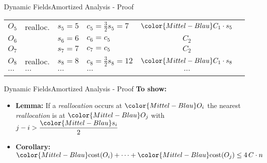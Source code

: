 \begin{frame}{Dynamic Fields}{Amortized Analysis - Proof}
\begin{table}[!h]
\begin{tabular}{|l|l|l|l|c|@{}l}
      \cmidrule{1-5}
      $O_5$ & {\color{Mittel-Blau}realloc.} &
      $s_5 = 5$ & {\color{Mittel-Blau}$c_5 = \frac{3}{2} s_5 = 7$} &
      ${\color{Mittel-Blau}C_1 \cdot s_5}$ &
      \raisebox{-0.5em}{\multirow{3}{*}{%
        $\left.\begin{array}{@{}l@{}}\\[3.25em]\end{array}\right\rbrace
        \begin{array}{@{}l@{}}
          \text{distance}\\
          3 \geq \left\lfloor\dfrac{{\color{Mittel-Blau}s_5}}{2}\right\rfloor
        \end{array}$%
      }}\\
      $O_6$ & {} & $s_6 = 6$ & $c_6 = c_5$ & $C_2$\\
      $O_7$ & {} & $s_7 = 7$ & $c_7 = c_5$ & $C_2$\\
      \cmidrule{1-5}
      $O_8$ & {\color{Mittel-Blau}realloc.} &
      $s_8 = 8$ & {\color{Mittel-Blau}$c_8 = \frac{3}{2} s_8 = 12$} &
      ${\color{Mittel-Blau}C_1 \cdot s_8}$\\
      $\dots$ & $\dots$ & $\dots$ & $\dots$ & $\dots$\\
      \addlinespace[0.5\aboverulesep]\cmidrule[\heavyrulewidth]{1-5}
    \end{tabular}
  \end{table}
\end{frame}


\begin{frame}{Dynamic Fields}{Amortized Analysis - Proof}
  \textbf{To show:}
  \begin{itemize}
    \item
      \textbf{Lemma:}
      If a \textit{reallocation} occurs at ${\color{Mittel-Blau}O_i}$
      the nearest \textit{reallocation} is at ${\color{Mittel-Blau}O_j}$
      with $j - i > \dfrac{{\color{Mittel-Blau}s_i}}{2}$
    \item
      \textbf{Corollary:}
      ${\color{Mittel-Blau}\mathrm{cost}(O_i)}+\dots
        +{\color{Mittel-Blau}\mathrm{cost}(O_j)} \leq 4 \, C \cdot n$
  \end{itemize}
\end{frame}


